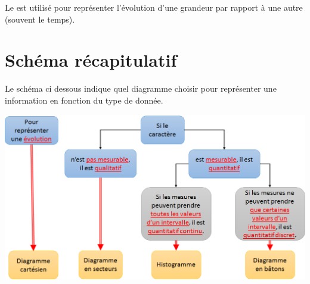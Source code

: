 \documentclass[12pt,a4paper]{article}
\begin{document}
\begin{mybox}
	Le  est utilisé pour représenter l'évolution d'une grandeur par rapport à une autre (souvent le temps). 
\end{mybox}
	


\section{Schéma récapitulatif}

\vspace*{1cm}

Le schéma ci dessous indique quel diagramme choisir pour représenter une information en fonction du type de donnée. 

\begin{center}
	\includegraphics[scale=0.78]{img/bilan}
\end{center}
\end{document}
